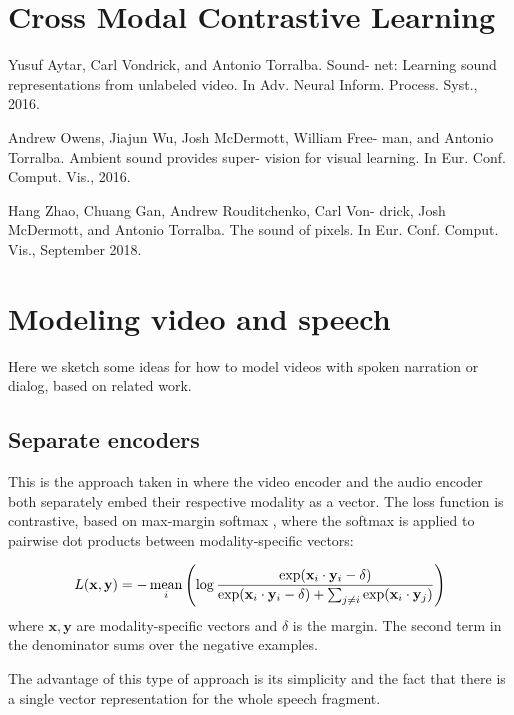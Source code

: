 

\appendix

\section{Cross Modal Contrastive Learning}

Yusuf Aytar, Carl Vondrick, and Antonio Torralba. Sound-
net: Learning sound representations from unlabeled video.
In Adv. Neural Inform. Process. Syst., 2016. 

Andrew Owens, Jiajun Wu, Josh McDermott, William Free-
man, and Antonio Torralba. Ambient sound provides super-
vision for visual learning. In Eur. Conf. Comput. Vis., 2016.

Hang Zhao, Chuang Gan, Andrew Rouditchenko, Carl Von-
drick, Josh McDermott, and Antonio Torralba. The sound of
pixels. In Eur. Conf. Comput. Vis., September 2018.

\section{Modeling video and speech}
Here we sketch some ideas for how to model videos with spoken
narration or dialog, based on related work.

\subsection{Separate encoders}
This is the approach taken in \citet{rouditchenko2020avlnet} where the
video encoder and the audio encoder both separately embed their
respective modality as a vector. The loss function is contrastive,
based on max-margin softmax \citep{ilharco-etal-2019-large}, where the
softmax is applied to pairwise dot products between modality-specific
vectors:

\begin{equation}
  \label{eq:mms}
  L(\mathbf{x}, \mathbf{y}) = - \operatorname*{mean}_i \left(
    \log \frac{\exp(\mathbf{x}_i\cdot \mathbf{y}_i-\delta)}
    { \exp(\mathbf{x}_i\cdot \mathbf{y}_i-\delta) + \sum_{j\neq i}
      \exp(\mathbf{x}_i \cdot \mathbf{y}_j)  }
  \right)
\end{equation}
where $\mathbf{x, y}$ are modality-specific vectors and $\delta$ is the
margin. The second term in the denominator sums over the negative
examples.

The advantage of this type of approach is its simplicity and the fact
that there is a single vector representation for the whole speech
fragment.

